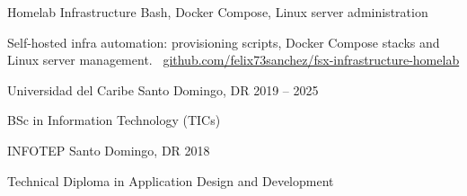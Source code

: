 \documentclass[]{awesome-cv}
\begin{document}
\begin{cventries}
	\vspace{-3mm}
	\cventry
	{}
	{Homelab Infrastructure \vspace{-5mm}}
	{Bash, Docker Compose, Linux server administration \vspace{-5mm}}
	{}
	{\begin{cvsectionnormaltext}
		\item {Self-hosted infra automation: provisioning scripts, Docker Compose stacks and Linux server management.
		\newline \faGithubSquare\ \href{https://github.com/felix73sanchez/fsx-infrastructure-homelab}{github.com/felix73sanchez/fsx-infrastructure-homelab}}
	\end{cvsectionnormaltext}}

	\vspace{-5mm}

\end{cventries}

\begin{cventries}
	\vspace{-3mm}
	\cventry
	{}
	{Universidad del Caribe \vspace{-5mm}}
	{Santo Domingo, DR \vspace{-5mm}}
	{2019 -- 2025 \vspace{-5mm}}
	{\begin{cvsectionnormaltext}
		\item{BSc in Information Technology (TICs)}
	\end{cvsectionnormaltext}}

	\vspace{-3mm}
	\cventry
	{}
	{INFOTEP \vspace{-5mm}}
	{Santo Domingo, DR \vspace{-5mm}}
	{2018 \vspace{-5mm}}
	{\begin{cvsectionnormaltext}
		\item{Technical Diploma in Application Design and Development}
	\end{cvsectionnormaltext}}
\end{cventries}
\end{document}
